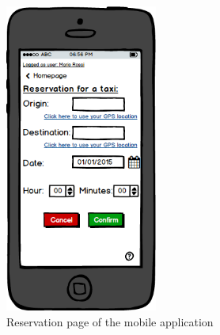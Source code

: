 \begin{figure}[H]
    \centering
    \includegraphics[width=5cm]{./Mockups/Reservation.png}
    \caption{Reservation page of the mobile application}
\end{figure}
